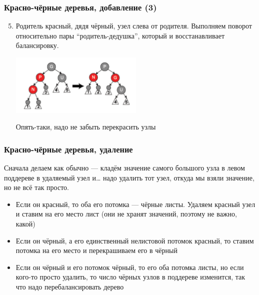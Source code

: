 \documentclass{../../slides-style}
\begin{document}
    \begin{frame}
        \frametitle{Красно-чёрные деревья, добавление (3)}
        \begin{enumerate}
            \setcounter{enumi}{4}
            \item Родитель красный, дядя чёрный, узел слева от родителя. Выполняем поворот относительно пары ``родитель-дедушка'', который и восстанавливает балансировку.
            \begin{center}
                \includegraphics[width=0.5\textwidth]{addition-to-red-black-tree3.png}
            \end{center}
            Опять-таки, надо не забыть перекрасить узлы
        \end{enumerate}
    \end{frame}

    \begin{frame}
        \frametitle{Красно-чёрные деревья, удаление}
        Сначала делаем как обычно --- кладём значение самого большого узла в левом поддереве в удаляемый узел и… надо удалить тот узел, откуда мы взяли значение, но не всё так просто.
        \begin{itemize}
            \item Если он красный, то оба его потомка --- чёрные листы. Удаляем красный узел и ставим на его место лист (они не хранят значений, поэтому не важно, какой)
            \item Если он чёрный, а его единственный нелистовой потомок красный, то ставим потомка на его место и перекрашиваем его в чёрный
            \item Если он чёрный и его потомок чёрный, то его оба потомка листы, но если кого-то просто удалить, то число чёрных узлов в поддереве изменится, так что надо перебалансировать дерево
        \end{itemize}
    \end{frame}
\end{document}
